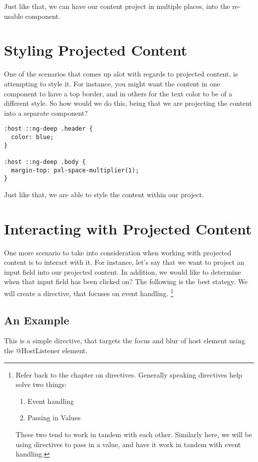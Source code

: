 Just like that, we can have our content project in multiple places, into the
re-usable component.

\section{Styling Projected Content}
One of the scenarios that comes up alot with regards to projected content, is
attempting to style it. For instance, you might want the content in one
component to have a top border, and in others for the text color to be of a
different style. So how would we do this, being that we are projecting the
content into a separate component?
\begin{verbatim}
:host ::ng-deep .header {
  color: blue;
}

:host ::ng-deep .body {
  margin-top: pxl-space-multiplier(1);
}
\end{verbatim}

Just like that, we are able to style the content within our project.

\section{ Interacting with Projected Content }
One more scenario to take into consideration when working with projected content
is to interact with it. For instance, let's say that we want to project an
input field into our projected content. In addition, we would like to determine
when that input field has been clicked on? The following is the best stategy.
We will create a directive, that focuses on event handling.
\footnote{Refer back to the chapter on directives. Generally speaking directives
help solve two things:
\begin{enumerate}
  \item Event handling
  \item Passing in Values
\end{enumerate}
These two tend to work in tandem with each other. Similarly here, we will be
using directives to pass in a value, and have it work in tandem with event
handling.
}

\subsection{ An Example }
This is a simple directive, that targets the focus and blur of host element
using the @HostListener element.

